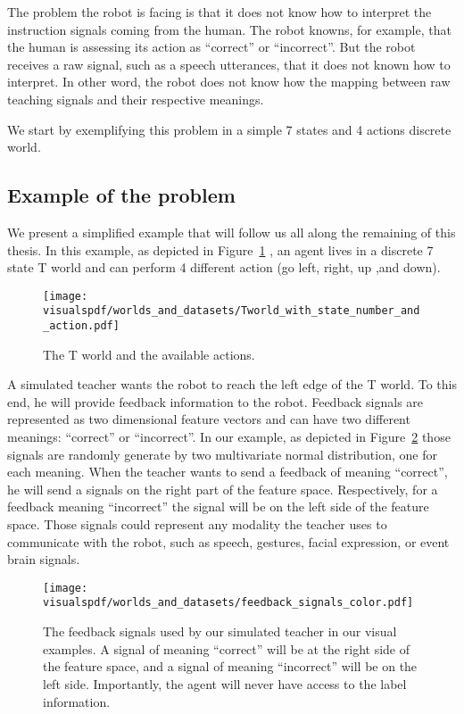 The problem the robot is facing is that it does not know how to interpret the instruction signals coming from the human. The robot knowns, for example, that the human is assessing its action as ``correct'' or ``incorrect''. But the robot receives a raw signal, such as a speech utterances, that it does not known how to interpret. In other word, the robot does not know how the mapping between raw teaching signals and their respective meanings.

We start by exemplifying this problem in a simple 7 states and 4 actions discrete world.

\subsection{Example of the problem}
\label{chapter:lfui:example}

We present a simplified example that will follow us all along the remaining of this thesis. In this example, as depicted in Figure~\ref{fig:Tworld} , an agent lives in a discrete 7 state T world and can perform 4 different action (go left, right, up ,and down).

\begin{figure}[!htbp]
  \centering
  \texttt{[image: \\visualspdf/worlds\_and\_datasets/Tworld\_with\_state\_number\_and\_action.pdf]}
  \caption{The T world and the available actions.}
  \label{fig:Tworld}
\end{figure}

A simulated teacher wants the robot to reach the left edge of the T world. To this end, he will provide feedback information to the robot. Feedback signals are represented as two dimensional feature vectors and can have two different meanings: ``correct'' or ``incorrect''. In our example, as depicted in Figure~\ref{fig:feedbacksignals} those signals are randomly generate by two multivariate normal distribution, one for each meaning. When the teacher wants to send a feedback of meaning ``correct'', he will send a signals on the right part of the feature space. Respectively, for a feedback meaning ``incorrect'' the signal will be on the left side of the feature space. Those signals could represent any modality the teacher uses to communicate with the robot, such as speech, gestures, facial expression, or event brain signals. 

\begin{figure}[!htbp]
  \centering
  \texttt{[image: \\visualspdf/worlds\_and\_datasets/feedback\_signals\_color.pdf]}
  \caption{The feedback signals used by our simulated teacher in our visual examples. A signal of meaning ``correct'' will be at the right side of the feature space, and a signal of meaning ``incorrect'' will be on the left side. Importantly, the agent will never have access to the label information.}
  \label{fig:feedbacksignals}
\end{figure}

